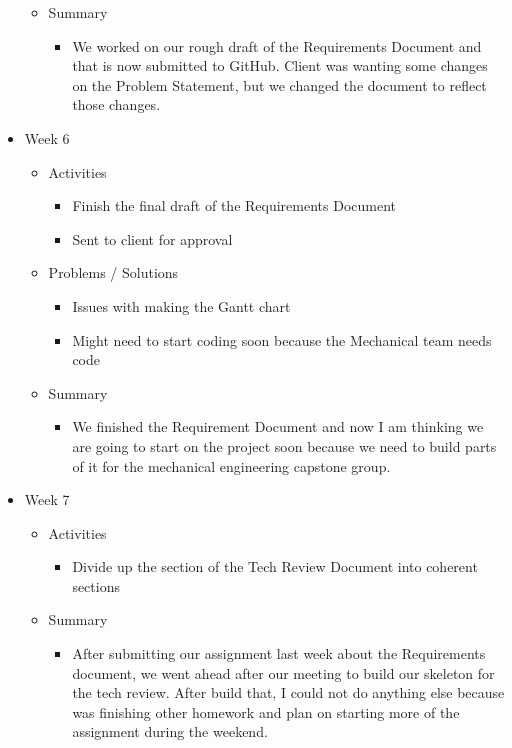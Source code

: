 \begin{itemize}
\begin{itemize}
\item Summary
\begin{itemize}
\item We worked on our rough draft of the Requirements Document and that is now submitted to GitHub. Client was wanting some changes on the Problem Statement, but we changed the document to reflect those changes.
\end{itemize}
\end{itemize}
\item Week 6
\begin{itemize}
\item Activities
\begin{itemize}
\item Finish the final draft of the Requirements Document
\item Sent to client for approval
\end{itemize}
\item Problems / Solutions
\begin{itemize}
\item Issues with making the Gantt chart
\item Might need to start coding soon because the Mechanical team needs code
\end{itemize}
\item Summary
\begin{itemize}
\item We finished the Requirement Document and now I am thinking we are going to start on the project soon because we need to build parts of it for the mechanical engineering capstone group. 
\end{itemize}
\end{itemize}
\item Week 7
\begin{itemize}
\item Activities
\begin{itemize}
\item Divide up the section of the Tech Review Document into coherent sections
\end{itemize}
\item Summary
\begin{itemize}
\item After submitting our assignment last week about the Requirements document, we went ahead after our meeting to build our skeleton for the tech review. After build that, I could not do anything else because was finishing other homework and plan on starting more of the assignment during the weekend.
\end{itemize}

\end{itemize}
\end{itemize}
